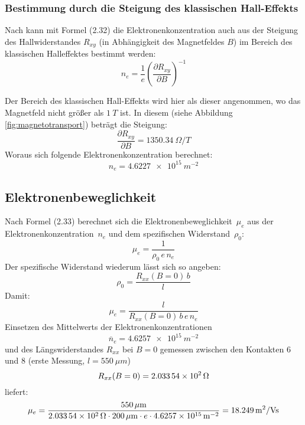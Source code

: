 \documentclass[a4paper]{article}
\begin{document}
\subsubsection*{Bestimmung durch die Steigung des klassischen Hall-Effekts}
Nach \citet{Bockhorn} kann mit Formel (2.32) die Elektronenkonzentration
auch aus der Steigung des Hallwiderstandes $R_{xy}$
(in Abhängigkeit des Magnetfeldes $B$) im Bereich des klassischen Halleffektes
bestimmt werden:
\begin{equation}
n_e = \frac{1}{e}\left(\frac{\partial R_{xy}}{\partial B}\right)^{-1}
\label{eq:ele_konz_steigung}
\end{equation}

Der Bereich des klassischen Hall-Effekts wird hier als dieser angenommen, wo
das Magnetfeld nicht größer als $\SI{1}{T}$ ist.
In diesem (siehe Abbildung \ref{fig:magnetotransport}) beträgt die Steigung:
\begin{equation*}
\frac{\partial R_{xy}}{\partial B} = \SI{1350,34}{\Omega/T}
\end{equation*}
Woraus sich folgende Elektronenkonzentration berechnet:
\begin{equation*} n_e = \SI{4.6227e15}{m^{-2}} \end{equation*}



\subsection*{Elektronenbeweglichkeit}
Nach Formel (2.33) \citet{Bockhorn} berechnet sich
die Elektronenbeweglichkeit~$\mu_e$ aus
der Elektronenkonzentration~$n_e$ und
dem spezifischen Widerstand~$\rho_0$:
\begin{equation}
\mu_e = \frac{1}{\rho_0 \, e \, n_e}
\end{equation}
Der spezifische Widerstand wiederum lässt sich so angeben:
\begin{equation}
\rho_0 = \frac{R_{xx}(B=0) \, b}{l}
\end{equation}
Damit:
\begin{equation}
\label{eq:elektronenbeweglichkeit}
\mu_e = \frac{l}{R_{xx}(B=0)\, b \, e \, n_e}
\end{equation}
Einsetzen des Mittelwerts der Elektronenkonzentrationen
\begin{equation*}
\overline n_e = \SI{4.6257e15}{m^{-2}}
\end{equation*}
und des Längswiderstandes $R_{xx}$ bei $B=0$ gemessen zwischen den
Kontakten 6 und 8 (erste Messung, $l=\SI{550}{\mu m}$)
\begin{equation*}
R_{xx}(B=0) = \SI{2.03354E2}{\Omega}
\end{equation*}
liefert:
\begin{equation*}
\mu_e = \frac{ \SI{550}{\mu m} }
 	     {\SI{2.03354E2}{\Omega} \cdot \SI{200}{\mu m} \cdot e \cdot \SI{4.6257e15}{m^{-2}}}
      = \SI{18.249}{m^2 / Vs}
\end{equation*}
\end{document}
